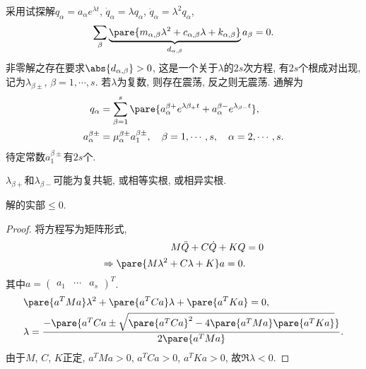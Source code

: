 \documentclass[../LectureNotes.tex]{subfiles}
\begin{document}
采用试探解$q_\alpha = a_\alpha e^{\lambda t}$, $\dot{q}_\alpha = \lambda q_\alpha$, $\ddot{q}_\alpha = \lambda^2 q_\alpha$,
\[ \sum_\beta \underbrace{\pare{m_{\alpha,\beta} \lambda^2 + c_{\alpha,\beta} \lambda + k_{\alpha,\beta}}}_{d_{\alpha,\beta}}a_\beta = 0. \]
非零解之存在要求$\abs{d_{\alpha,\beta}}>0$, 这是一个关于$\lambda$的$2s$次方程, 有$2s$个根成对出现, 记为$\lambda_{\beta\pm}$, $\beta = 1,\cdots,s$. 若$\lambda$为复数, 则存在震荡, 反之则无震荡. 通解为
\begin{align*}
    q_\alpha &= \sum_{\beta=1}^s \pare{a_\alpha^{\beta+}e^{\lambda\beta_+ t} + a_\alpha^{\beta-}e^{\lambda_{\beta-}t}}, \\
    a_\alpha^{\beta\pm} &= \mu_\alpha^{\beta\pm} a_1^{\beta\pm},\quad \beta = 1,\cdots,s,\quad \alpha = 2,\cdots, s.
\end{align*}
待定常数$a_1^{\beta\pm}$有$2s$个.
\begin{remark}
    $\lambda_{\beta+}$和$\lambda_{\beta-}$可能为复共轭, 或相等实根, 或相异实根.
\end{remark}
\begin{proposition}
    解的实部$\le 0$.
\end{proposition}
\begin{proof}
    将方程写为矩阵形式,
    \begin{align*}
        M\ddot{Q} + C\dot{Q} + KQ &= 0 \\
        \Rightarrow \pare{M\lambda^2 + C\lambda + K} a = 0.
    \end{align*}
    其中$\displaystyle a=\begin{pmatrix}
        a_1 & \cdots & a_s
    \end{pmatrix}^T$.
    \begin{align*}
        & \pare{a^TMa}\lambda^2 +\pare{a^TCa}\lambda + \pare{a^TKa} = 0,\\
        & \lambda = \frac{-\pare{a^TCa \pm \sqrt{\pare{a^TCa}^2 - 4\pare{a^TMa}\pare{a^TKa}}}}{2\pare{a^TMa}}.
    \end{align*}
    由于$M$, $C$, $K$正定, $a^TMa > 0$, $a^TCa>0$, $a^TKa>0$, 故$\Re\lambda < 0$.
\end{proof}
\end{document}
